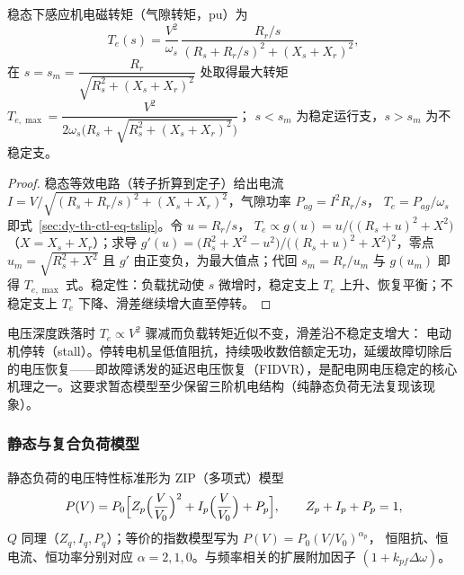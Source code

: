 \begin{proposition}\label{sec:dy-th-ctl-prop-tslip}
稳态下感应机电磁转矩（气隙转矩，pu）为
\begin{equation}
T_e(s)=\frac{V^2}{\omega_s}\,
\frac{R_r/s}{(R_s+R_r/s)^2+(X_s+X_r)^2},
\label{sec:dy-th-ctl-eq-tslip}
\end{equation}
在 $s=s_m=\dfrac{R_r}{\sqrt{R_s^2+(X_s+X_r)^2}}$ 处取得最大转矩
$T_{e,\max}=\dfrac{V^2}{2\omega_s\bigl(R_s+\sqrt{R_s^2+(X_s+X_r)^2}\bigr)}$；
$s<s_m$ 为稳定运行支，$s>s_m$ 为不稳定支。
\end{proposition}

\begin{proof}
稳态等效电路（转子折算到定子）给出电流
$I=V/\sqrt{(R_s+R_r/s)^2+(X_s+X_r)^2}$，气隙功率 $P_{ag}=I^2R_r/s$，
$T_e=P_{ag}/\omega_s$ 即式~\eqref{sec:dy-th-ctl-eq-tslip}。令 $u=R_r/s$，
$T_e\propto g(u)=u/\bigl((R_s+u)^2+X^2\bigr)$（$X=X_s+X_r$）；求导
$g'(u)=\bigl(R_s^2+X^2-u^2\bigr)/\bigl((R_s+u)^2+X^2\bigr)^2$，零点
$u_m=\sqrt{R_s^2+X^2}$ 且 $g'$ 由正变负，为最大值点；代回 $s_m=R_r/u_m$ 与
$g(u_m)$ 即得 $T_{e,\max}$ 式。稳定性：负载扰动使 $s$ 微增时，稳定支上
$T_e$ 上升、恢复平衡；不稳定支上 $T_e$ 下降、滑差继续增大直至停转。
\end{proof}

\begin{remark}
电压深度跌落时 $T_e\propto V^2$ 骤减而负载转矩近似不变，滑差沿不稳定支增大：
电动机停转（stall）。停转电机呈低值阻抗，持续吸收数倍额定无功，延缓故障切除后
的电压恢复——即故障诱发的延迟电压恢复（FIDVR），是配电网电压稳定的核心
机理之一。这要求暂态模型至少保留三阶机电结构（纯静态负荷无法复现该现象）。
\end{remark}

\subsubsection{静态与复合负荷模型}

\begin{definition}\label{sec:dy-th-ctl-def-zip}
静态负荷的电压特性标准形为 ZIP（多项式）模型
\begin{equation}
P(V)=P_0\Bigl[Z_p\Bigl(\frac{V}{V_0}\Bigr)^2+I_p\Bigl(\frac{V}{V_0}\Bigr)+P_p\Bigr],
\qquad Z_p+I_p+P_p=1,
\label{sec:dy-th-ctl-eq-zip}
\end{equation}
$Q$ 同理（$Z_q,I_q,P_q$）；等价的指数模型写为 $P(V)=P_0(V/V_0)^{\alpha_p}$，
恒阻抗、恒电流、恒功率分别对应 $\alpha=2,1,0$。与频率相关的扩展附加因子
$(1+k_{pf}\Delta\omega)$。
\end{definition}

